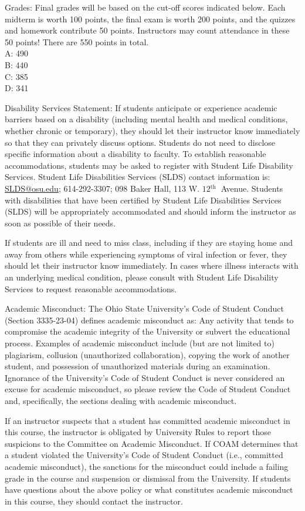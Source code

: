 \documentclass{ximera}
\begin{document}
Grades: Final grades will be based on the cut-off scores indicated below. Each midterm is worth 100 points, the final exam is worth 200 points, and the quizzes and homework contribute 50 points. Instructors may count attendance in these 50 points! There are 550 points in total.\\
A: 490\\
B: 440\\
C: 385\\
D: 341

Disability Services Statement: If students anticipate or experience academic barriers based on a disability (including mental health and medical conditions, whether chronic or temporary), they should let their instructor know immediately so that they can privately discuss options. Students do not need to disclose specific information about a disability to faculty. To establish reasonable accommodations, students may be asked to register with Student Life Disability Services. Student Life Disabilities Services (SLDS) contact information is: \href{mailto:SLDS@osu.edu}{SLDS@osu.edu}; 614-292-3307; 098 Baker Hall, 113 W. $12{ }^{\text {th }}$ Avenue. Students with disabilities that have been certified by Student Life Disabilities Services (SLDS) will be appropriately accommodated and should inform the instructor as soon as possible of their needs.

If students are ill and need to miss class, including if they are staying home and away from others while experiencing symptoms of viral infection or fever, they should let their instructor know immediately. In cases where illness interacts with an underlying medical condition, please consult with Student Life Disability Services to request reasonable accommodations.

Academic Misconduct: The Ohio State University's Code of Student Conduct (Section 3335-23-04) defines academic misconduct as: Any activity that tends to compromise the academic integrity of the University or subvert the educational process. Examples of academic misconduct include (but are not limited to) plagiarism, collusion (unauthorized collaboration), copying the work of another student, and possession of unauthorized materials during an examination. Ignorance of the University's Code of Student Conduct is never considered an excuse for academic misconduct, so please review the Code of Student Conduct and, specifically, the sections dealing with academic misconduct.

If an instructor suspects that a student has committed academic misconduct in this course, the instructor is obligated by University Rules to report those suspicions to the Committee on Academic Misconduct. If COAM determines that a student violated the University's Code of Student Conduct (i.e., committed academic misconduct), the sanctions for the misconduct could include a failing grade in the course and suspension or dismissal from the University. If students have questions about the above policy or what constitutes academic misconduct in this course, they should contact the instructor.
\end{document}
